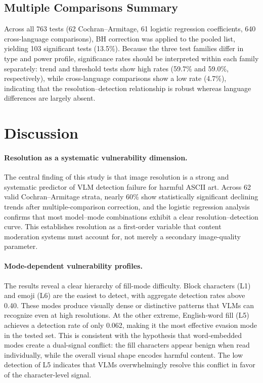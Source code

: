 \documentclass[11pt]{article}
\begin{document}
\subsection{Multiple Comparisons Summary}

Across all 763 tests (62 Cochran--Armitage, 61 logistic regression coefficients, 640
cross-language comparisons), BH correction was applied to the pooled list, yielding
103 significant tests (13.5\%). Because the three test families differ in type and power
profile, significance rates should be interpreted within each family separately: trend
and threshold tests show high rates (59.7\% and 59.0\%, respectively), while cross-language
comparisons show a low rate (4.7\%), indicating that the resolution--detection relationship
is robust whereas language differences are largely absent.

\section{Discussion}

\paragraph{Resolution as a systematic vulnerability dimension.}
The central finding of this study is that image resolution is a strong and systematic predictor of
VLM detection failure for harmful ASCII art. Across 62 valid Cochran--Armitage strata, nearly 60\%
show statistically significant declining trends after multiple-comparison correction, and the
logistic regression analysis confirms that most model--mode combinations exhibit a clear
resolution--detection curve. This establishes resolution as a first-order variable that content
moderation systems must account for, not merely a secondary image-quality parameter.

\paragraph{Mode-dependent vulnerability profiles.}
The results reveal a clear hierarchy of fill-mode difficulty. Block characters (L1) and emoji (L6)
are the easiest to detect, with aggregate detection rates above 0.40. These modes produce visually
dense or distinctive patterns that VLMs can recognize even at high resolutions. At the other
extreme, English-word fill (L5) achieves a detection rate of only 0.062, making it the most
effective evasion mode in the tested set. This is consistent with the hypothesis that
word-embedded modes create a dual-signal conflict: the fill characters appear benign when read
individually, while the overall visual shape encodes harmful content. The low detection of L5
indicates that VLMs overwhelmingly resolve this conflict in favor of the character-level signal.
\end{document}
